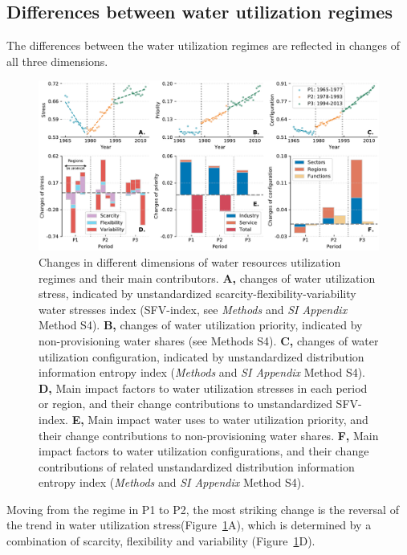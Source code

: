 \documentclass[9pt, twocolumn, twoside, lineno]{pnas-new}
\begin{document}
\subsection*{Differences between water utilization regimes}
The differences between the water utilization regimes are reflected in changes of all three dimensions.
\begin{figure}%
	\centering
	\includegraphics[width=\linewidth]{../../figures/main/dimensions.pdf}
	\caption{
		Changes in different dimensions of water resources utilization regimes and their main contributors.
		\textbf{A,} changes of water utilization stress, indicated by unstandardized scarcity-flexibility-variability water stresses index (SFV-index, see \textit{Methods} and \textit{SI Appendix} Method S4).
		\textbf{B,} changes of water utilization priority, indicated by non-provisioning water shares (see Methods S4).
		\textbf{C,} changes of water utilization configuration, indicated by unstandardized distribution information entropy index (\textit{Methods} and \textit{SI Appendix} Method S4).
		\textbf{D,} Main impact factors to water utilization stresses in each period or region, and their change contributions to unstandardized SFV-index.
		\textbf{E,} Main impact water uses to water utilization priority, and their change contributions to non-provisioning water shares.
		\textbf{F,} Main impact factors to water utilization configurations, and their change contributions of related unstandardized distribution information entropy index (\textit{Methods} and \textit{SI Appendix} Method S4).
		}
	\label{fig:dimensions}
\end{figure}
Moving from the regime in P1 to P2, the most striking change is the reversal of the trend in water utilization stress(Figure~\ref{fig:dimensions}A), which is determined by a combination of scarcity, flexibility and variability (Figure~\ref{fig:dimensions}D).   
\end{document}
